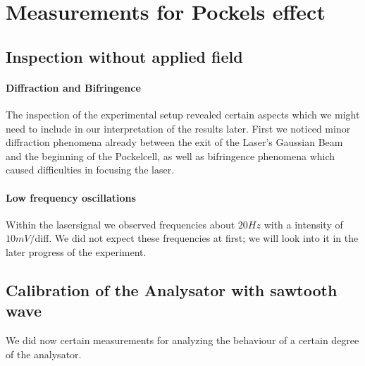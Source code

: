\newcommand{\figdirpockels}{analysis_pockels/figures/}

\section{Measurements for Pockels effect}
\subsection{Inspection without applied field}
\paragraph{Diffraction and Bifringence}
The inspection of the experimental setup revealed certain aspects
which we might need to include in our interpretation of the results
later. First we noticed minor diffraction phenomena already between
the exit of the Laser's Gaussian Beam and the beginning of the
Pockelcell, as well as bifringence phenomena which caused difficulties
in focusing the laser.  
\paragraph{Low frequency oscillations} Within the lasersignal 
we observed frequencies about $20 Hz$ with a intensity of $10mV/$diff.
We did not expect these frequencies at first; we will look into it
in the later progress of the experiment.
\subsection{Calibration of the Analysator with sawtooth wave}
We did now certain measurements for analyzing the behaviour of a 
certain degree of the analysator.
\newcommand{\picwidth}{0.48\textwidth}


